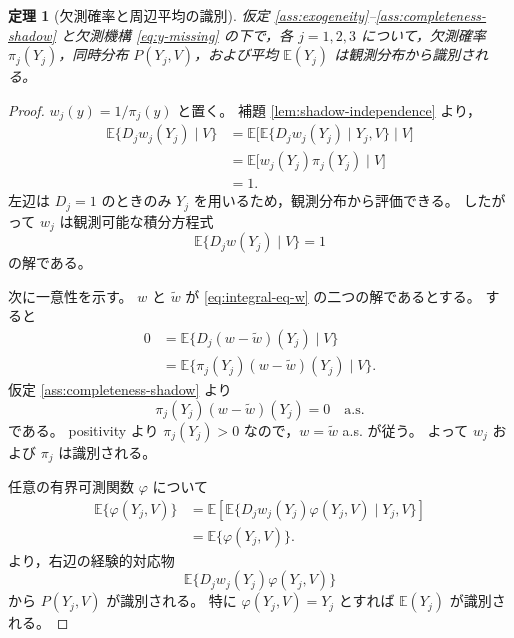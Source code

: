 \documentclass[dvipdfmx,autodetect-engine]{jsarticle}
\newtheorem{theorem}{定理}
\newcommand{\E}{\mathbb{E}}
\newcommand{\1}{\mathbf{1}}
\begin{document}
\begin{theorem}[欠測確率と周辺平均の識別]
\label{thm:shadow-identification}
仮定 \ref{ass:exogeneity}--\ref{ass:completeness-shadow} と欠測機構 \eqref{eq:y-missing} の下で，各 $j=1,2,3$ について，欠測確率 $\pi_j(Y_j)$，同時分布 $P(Y_j,V)$，および平均 $\E(Y_j)$ は観測分布から識別される。
\end{theorem}

\begin{proof}
$w_j(y)=1/\pi_j(y)$ と置く。
補題 \ref{lem:shadow-independence} より，
\begin{align}
  \E\{D_jw_j(Y_j)\mid V\}
  &= \E\bigl[\E\{D_jw_j(Y_j)\mid Y_j,V\}\mid V\bigr] \\
  &= \E\bigl[w_j(Y_j)\pi_j(Y_j)\mid V\bigr] \\
  &=1.
  \label{eq:ipw-moment}
\end{align}
左辺は $D_j=1$ のときのみ $Y_j$ を用いるため，観測分布から評価できる。
したがって $w_j$ は観測可能な積分方程式
\begin{equation}
  \E\{D_j w(Y_j)\mid V\}=1
  \label{eq:integral-eq-w}
\end{equation}
の解である。

次に一意性を示す。
$w$ と $\widetilde w$ が \eqref{eq:integral-eq-w} の二つの解であるとする。
すると
\begin{align}
  0
  &=\E\{D_j(w-\widetilde w)(Y_j)\mid V\} \\
  &=\E\{\pi_j(Y_j)(w-\widetilde w)(Y_j)\mid V\}.
\end{align}
仮定 \ref{ass:completeness-shadow} より
\begin{equation}
  \pi_j(Y_j)(w-\widetilde w)(Y_j)=0 \quad \text{a.s.}
\end{equation}
である。
positivity より $\pi_j(Y_j)>0$ なので，$w=\widetilde w$ a.s. が従う。
よって $w_j$ および $\pi_j$ は識別される。

任意の有界可測関数 $\varphi$ について
\begin{align}
  \E\{\varphi(Y_j,V)\}
  &=\E\left[\E\{D_jw_j(Y_j)\varphi(Y_j,V)\mid Y_j,V\}\right] \\
  &=\E\{\varphi(Y_j,V)\}.
\end{align}
より，右辺の経験的対応物
\begin{equation}
  \E\{D_jw_j(Y_j)\varphi(Y_j,V)\}
  \label{eq:ipw-functional}
\end{equation}
から $P(Y_j,V)$ が識別される。
特に $\varphi(Y_j,V)=Y_j$ とすれば $\E(Y_j)$ が識別される。
\end{proof}
\end{document}
